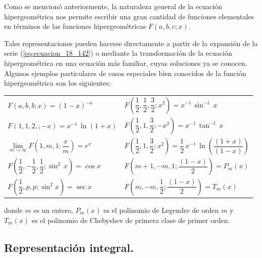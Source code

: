 Como se mencionó anteriormente, la naturaleza general de la ecuación hipergeométrica nos permite escribir una gran cantidad de funciones elementales en términos de las funciones hipergeométricas $F (a, b, c; x)$.
\par
Tales representaciones pueden hacerse directamente a partir de la expansión de la serie (\ref{eq:ecuacion_18_142}) o mediante la transformación de la ecuación hipergeométrica en una ecuación más familiar, cuyas soluciones ya se conocen. Algunos ejemplos particulares de casos especiales bien conocidos de la función hipergeométrica son los siguientes:
\begin{table}[H]
\centering
\fontsize{14}{14}\selectfont
\begin{tabular}{p{7cm} p{8.15cm}}
$F(a, b, b; x) = (1 - x)^{-a}$ & $F \left( \dfrac{1}{2}, \dfrac{1}{2}, \dfrac{3}{2}; x^{2} \right) = x^{-1} \, \sin^{-1} \, x$ \\[1.5em]
$F(1, 1, 2,; -x) = x^{-1} \, \ln (1 + x)$ & $F \left( \dfrac{1}{2}, 1, \dfrac{3}{2}; -x^{2} \right) = x^{-1} \, \tan^{-1} \, x$ \\[1.5em]
$\lim\limits_{m \to \infty} F \left(1, m, 1; \dfrac{x}{m}\right) = e^{x}$ & $F \left( \dfrac{1}{2}, 1, \dfrac{3}{2}; x^{2} \right) = \dfrac{1}{2} \, x^{-1} \, \ln \left( \dfrac{(1 + x)}{(1 - x)} \right)$ \\[1.5em]
$F \left( \dfrac{1}{2}, -\dfrac{1}{2}, \dfrac{1}{2}; \sin^{2} \, x \right) = \cos x$ & $F \left(m+1, -m, 1; \dfrac{(1 - x)}{2}\right) = P_{m} (x)$ \\[1.5em]
$F \left( \dfrac{1}{2}, p, p; \sin^{2} x \right) = \sec x$ & $F \left( m, -m, \dfrac{1}{2}; \dfrac{(1- x)}{2} \right) = T_{m} (x)$
\end{tabular}
\end{table}
donde $m$ es un entero, $P_{m}(x)$ es el polinomio de Legendre de orden $m$ y $T_{m}(x)$ es el polinomio de Chebyshev de primera clase de primer orden.

\subsection{Representación integral.}

